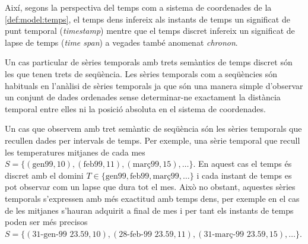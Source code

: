 Així, segons la perspectiva del temps com a sistema de coordenades de
la \autoref{def:model:temps}, el temps dens infereix als instants de
temps un significat de punt temporal (\emph{timestamp}) mentre que el
temps discret infereix un significat de lapse de temps (\emph{time
  span}) a vegades també anomenat \emph{chronon}.  


Un cas particular de sèries temporals amb trets semàntics de temps
discret són les que tenen trets de seqüència. Les sèries temporals com
a seqüències són habituals en l'anàlisi de sèries temporals ja que són
una manera simple d'observar un conjunt de dades ordenades sense
determinar-ne exactament la distància temporal entre elles ni la
posició absoluta en el sistema de coordenades.




\begin{example}
  Un cas que observem amb tret semàntic de seqüència són les sèries
  temporals que recullen dades per intervals de temps. Per exemple,
  una sèrie temporal que recull les temperatures mitjanes de cada mes
  $S=\{(\text{gen99},10),(\text{feb99},11),(\text{març99},15),\dotsc\}$. En
  aquest cas el temps és discret amb el domini
  $T\in\{\text{gen99},\text{feb99},\text{març99},\dotsc\}$ i cada
  instant de temps es pot observar com un lapse que dura tot el
  mes. Això no obstant, aquestes sèries temporals s'expressen amb més
  exactitud amb temps dens, per exemple en el cas de les mitjanes
  s'hauran adquirit a final de mes i per tant els instants de temps
  poden ser més precisos $S=\{(\text{31-gen-99 23.59},10),(\text{28-feb-99
    23.59},11),(\text{31-març-99 23.59},15),\dotsc\}$.
\end{example}


